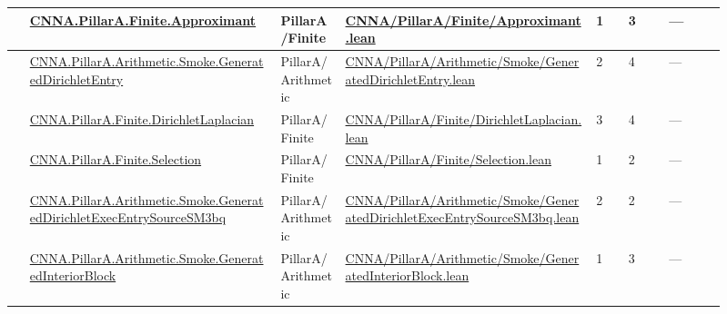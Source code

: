 \begin{longtable}{L{0.025\linewidth} L{0.315\linewidth} L{0.08\linewidth} L{0.315\linewidth} L{0.045\linewidth} L{0.055\linewidth} L{0.07\linewidth}}
\hline
{} & \href{run:repo_snapshot/CNNA/PillarA/Finite/Approximant.lean}{CNNA.\allowbreak{}PillarA.\allowbreak{}Finite.\allowbreak{}Approximant} & PillarA/\allowbreak{}Finite & \href{run:repo_snapshot/CNNA/PillarA/Finite/Approximant.lean}{CNNA/\allowbreak{}PillarA/\allowbreak{}Finite/\allowbreak{}Approximant.\allowbreak{}lean} & 1 & 3 & ---\\
\hline
{} & \href{run:repo_snapshot/CNNA/PillarA/Arithmetic/Smoke/GeneratedDirichletEntry.lean}{CNNA.\allowbreak{}PillarA.\allowbreak{}Arithmetic.\allowbreak{}Smoke.\allowbreak{}GeneratedDirichletEntry} & PillarA/\allowbreak{}Arithmetic & \href{run:repo_snapshot/CNNA/PillarA/Arithmetic/Smoke/GeneratedDirichletEntry.lean}{CNNA/\allowbreak{}PillarA/\allowbreak{}Arithmetic/\allowbreak{}Smoke/\allowbreak{}GeneratedDirichletEntry.\allowbreak{}lean} & 2 & 4 & ---\\
\hline
{} & \href{run:repo_snapshot/CNNA/PillarA/Finite/DirichletLaplacian.lean}{CNNA.\allowbreak{}PillarA.\allowbreak{}Finite.\allowbreak{}DirichletLaplacian} & PillarA/\allowbreak{}Finite & \href{run:repo_snapshot/CNNA/PillarA/Finite/DirichletLaplacian.lean}{CNNA/\allowbreak{}PillarA/\allowbreak{}Finite/\allowbreak{}DirichletLaplacian.\allowbreak{}lean} & 3 & 4 & ---\\
\hline
{} & \href{run:repo_snapshot/CNNA/PillarA/Finite/Selection.lean}{CNNA.\allowbreak{}PillarA.\allowbreak{}Finite.\allowbreak{}Selection} & PillarA/\allowbreak{}Finite & \href{run:repo_snapshot/CNNA/PillarA/Finite/Selection.lean}{CNNA/\allowbreak{}PillarA/\allowbreak{}Finite/\allowbreak{}Selection.\allowbreak{}lean} & 1 & 2 & ---\\
\hline
{} & \href{run:repo_snapshot/CNNA/PillarA/Arithmetic/Smoke/GeneratedDirichletExecEntrySourceSM3bq.lean}{CNNA.\allowbreak{}PillarA.\allowbreak{}Arithmetic.\allowbreak{}Smoke.\allowbreak{}GeneratedDirichletExecEntrySourceSM3bq} & PillarA/\allowbreak{}Arithmetic & \href{run:repo_snapshot/CNNA/PillarA/Arithmetic/Smoke/GeneratedDirichletExecEntrySourceSM3bq.lean}{CNNA/\allowbreak{}PillarA/\allowbreak{}Arithmetic/\allowbreak{}Smoke/\allowbreak{}GeneratedDirichletExecEntrySourceSM3bq.\allowbreak{}lean} & 2 & 2 & ---\\
\hline
{} & \href{run:repo_snapshot/CNNA/PillarA/Arithmetic/Smoke/GeneratedInteriorBlock.lean}{CNNA.\allowbreak{}PillarA.\allowbreak{}Arithmetic.\allowbreak{}Smoke.\allowbreak{}GeneratedInteriorBlock} & PillarA/\allowbreak{}Arithmetic & \href{run:repo_snapshot/CNNA/PillarA/Arithmetic/Smoke/GeneratedInteriorBlock.lean}{CNNA/\allowbreak{}PillarA/\allowbreak{}Arithmetic/\allowbreak{}Smoke/\allowbreak{}GeneratedInteriorBlock.\allowbreak{}lean} & 1 & 3 & ---\\

\end{longtable}
